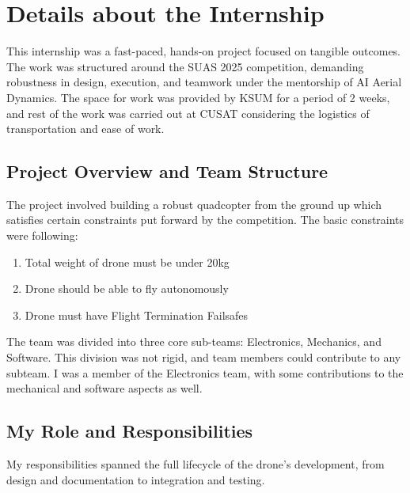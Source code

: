 \chapter{Details about the Internship}

This internship was a fast-paced, hands-on project focused on tangible outcomes.
The work was structured around the SUAS 2025 competition, demanding robustness in design, execution, and teamwork under the mentorship of AI Aerial Dynamics.
The space for work was provided by KSUM for a period of 2 weeks, and rest of the work was carried out at CUSAT considering the logistics of transportation and ease of work.

\section{Project Overview and Team Structure}

The project involved building a robust quadcopter from the ground up which satisfies certain constraints put forward by the competition.
The basic constraints were following:
\begin{enumerate}
	\item Total weight of drone must be under 20kg
	\item Drone should be able to fly autonomously
	\item Drone must have Flight Termination Failsafes
\end{enumerate}

The team was divided into three core sub-teams: Electronics, Mechanics, and Software.
This division was not rigid, and team members could contribute to any subteam.
I was a member of the Electronics team, with some contributions to the mechanical and software aspects as well.

\section{My Role and Responsibilities}

My responsibilities spanned the full lifecycle of the drone's development, from design and documentation to integration and testing.

